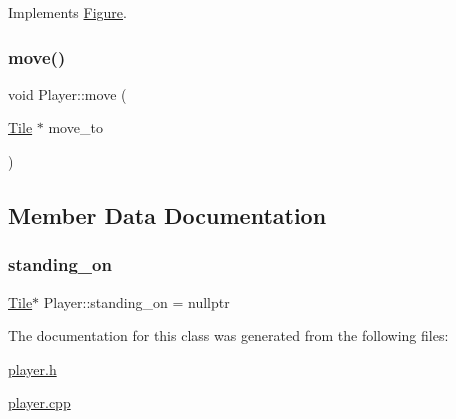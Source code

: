 Implements \hyperlink{classFigure_ac16583e764bdc244076957bf775e4866}{Figure}.

\mbox{\label{classPlayer_ae330dc5684cee833dede7f3728d60a90}} 
\subsubsection{\texorpdfstring{move()}{move()}}
{\footnotesize\ttfamily void Player\+::move (\begin{DoxyParamCaption}\item[{\hyperlink{classTile}{Tile} $\ast$}]{move\+\_\+to }\end{DoxyParamCaption})\hspace{0.3cm}{\ttfamily [inline]}}



\subsection{Member Data Documentation}
\mbox{\label{classPlayer_a7193ba7104612cf2ddecee5fbbe6f063}} 
\subsubsection{\texorpdfstring{standing\+\_\+on}{standing\_on}}
{\footnotesize\ttfamily \hyperlink{classTile}{Tile}$\ast$ Player\+::standing\+\_\+on = nullptr}



The documentation for this class was generated from the following files\+:\begin{DoxyCompactItemize}
\item 
\hyperlink{player_8h}{player.\+h}\item 
\hyperlink{player_8cpp}{player.\+cpp}\end{DoxyCompactItemize}
